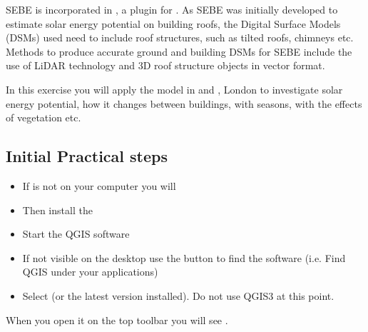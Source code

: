 \documentclass[letterpaper,10pt,english]{sphinxmanual}
\begin{document}
SEBE is incorporated in {\hyperref[\detokenize{index:index-page}]{}}, a plugin for
. As SEBE was initially developed to
estimate solar energy potential on building roofs, the Digital Surface
Models (DSMs) used need to include roof structures, such as tilted
roofs, chimneys etc. Methods to produce accurate ground and building
DSMs for SEBE include the use of LiDAR technology and 3D roof structure
objects in vector format.

In this exercise you will apply the model in  and , London to
investigate solar energy potential, how it changes between buildings,
with seasons, with the effects of vegetation etc.


\subsection{Initial Practical steps}
\label{\detokenize{Tutorials/SEBE:initial-practical-steps}}\begin{itemize}
\item {} 
If  is not on your computer you will {\hyperref[\detokenize{Getting_Started:getting-started}]{}}

\item {} 
Then install the {\hyperref[\detokenize{Getting_Started:getting-started}]{}}

\item {} 
Start the QGIS software

\item {} 
 If not visible on the desktop use the  button to
find the software (i.e. Find QGIS under your applications)

\item {} 
Select  (or the latest version installed). Do not use QGIS3 at this point.

\end{itemize}

When you open it on the top toolbar you will see .
\end{document}
